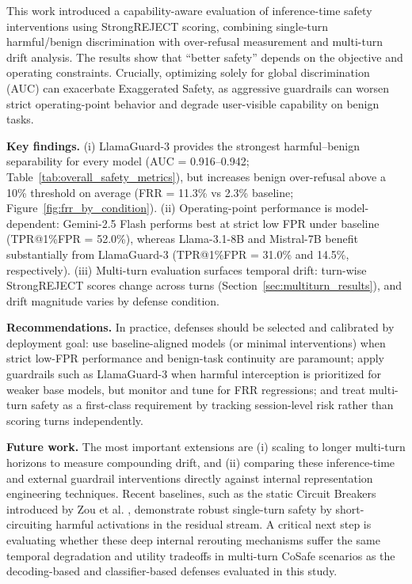 \documentclass[10pt, twocolumn]{article}
\begin{document}
This work introduced a capability-aware evaluation of inference-time safety interventions using StrongREJECT scoring, combining single-turn harmful/benign discrimination with over-refusal measurement and multi-turn drift analysis. The results show that ``better safety'' depends on the objective and operating constraints. Crucially, optimizing solely for global discrimination (AUC) can exacerbate Exaggerated Safety, as aggressive guardrails can worsen strict operating-point behavior and degrade user-visible capability on benign tasks.

\textbf{Key findings.} (i) LlamaGuard-3 provides the strongest harmful--benign separability for every model (AUC = 0.916--0.942; Table~\ref{tab:overall_safety_metrics}), but increases benign over-refusal above a 10\% threshold on average (FRR = 11.3\% vs 2.3\% baseline; Figure~\ref{fig:frr_by_condition}). (ii) Operating-point performance is model-dependent: Gemini-2.5 Flash performs best at strict low FPR under baseline (TPR@1\%FPR = 52.0\%), whereas Llama-3.1-8B and Mistral-7B benefit substantially from LlamaGuard-3 (TPR@1\%FPR = 31.0\% and 14.5\%, respectively). (iii) Multi-turn evaluation surfaces temporal drift: turn-wise StrongREJECT scores change across turns (Section~\ref{sec:multiturn_results}), and drift magnitude varies by defense condition.

\textbf{Recommendations.} In practice, defenses should be selected and calibrated by deployment goal: use baseline-aligned models (or minimal interventions) when strict low-FPR performance and benign-task continuity are paramount; apply guardrails such as LlamaGuard-3 when harmful interception is prioritized for weaker base models, but monitor and tune for FRR regressions; and treat multi-turn safety as a first-class requirement by tracking session-level risk rather than scoring turns independently.

\textbf{Future work.} The most important extensions are (i) scaling to longer multi-turn horizons to measure compounding drift, and (ii) comparing these inference-time and external guardrail interventions directly against internal representation engineering techniques. Recent baselines, such as the static Circuit Breakers introduced by Zou et al. \cite{zou2024improving}, demonstrate robust single-turn safety by short-circuiting harmful activations in the residual stream. A critical next step is evaluating whether these deep internal rerouting mechanisms suffer the same temporal degradation and utility tradeoffs in multi-turn CoSafe scenarios as the decoding-based and classifier-based defenses evaluated in this study.
\end{document}
